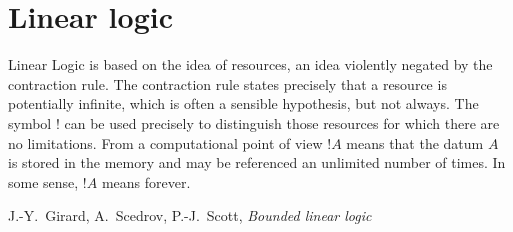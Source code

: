 \documentclass[english,letter paper,12pt,reqno]{article}
\theoremstyle{example}
\begin{document}



\section{Linear logic}\label{section:intro_ll}

\setlength{\epigraphwidth}{0.8\textwidth}
\epigraph{Linear Logic is based on the idea of resources, an idea violently negated by the contraction rule. The contraction rule states precisely that a resource is potentially infinite, which is often a sensible hypothesis, but not always. The symbol $!$ can be used precisely to distinguish those resources for which there are no limitations. From a computational point of view $!A$ means that the datum $A$ is stored in the memory and may be referenced an unlimited number of times. In some sense, $!A$ means forever.}
{J.-Y.~Girard, A.~Scedrov, P.-J.~Scott, \textit{Bounded linear logic}}
\end{document}
